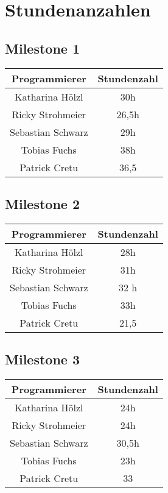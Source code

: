 \chapter{Stundenanzahlen}
\section{Milestone 1}
\begin{center}
	\begin{tabular}{|c|c|}
		\hline \textbf{Programmierer} & \textbf{Stundenzahl} \\ 
		\hline Katharina Hölzl  & 30h \\ 
		\hline Ricky Strohmeier & 26,5h \\ 
		\hline Sebastian Schwarz & 29h \\ 
		\hline Tobias Fuchs &  38h\\ 
		\hline Patrick Cretu &  36,5\\ 
		\hline 
	\end{tabular}
\end{center} 
\section{Milestone 2}
\begin{center}
	\begin{tabular}{|c|c|}
		\hline \textbf{Programmierer} & \textbf{Stundenzahl} \\ 
		\hline Katharina Hölzl  & 28h  \\ 
		\hline Ricky Strohmeier & 31h\\ 
		\hline Sebastian Schwarz & 32 h \\ 
		\hline Tobias Fuchs & 33h \\ 
		\hline Patrick Cretu &  21,5\\ 
		\hline 
	\end{tabular}
\end{center} 
\section{Milestone 3}
\begin{center}
	\begin{tabular}{|c|c|}
		\hline \textbf{Programmierer} & \textbf{Stundenzahl} \\ 
		\hline Katharina Hölzl  & 24h \\ 
		\hline Ricky Strohmeier & 24h\\ 
		\hline Sebastian Schwarz & 30,5h \\ 
		\hline Tobias Fuchs &  23h\\ 
		\hline Patrick Cretu &  33\\ 
		\hline 
	\end{tabular}
\end{center} 
